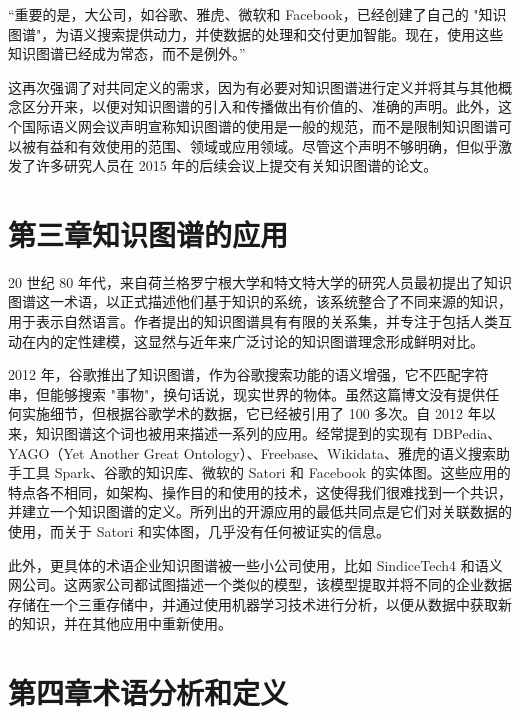 \documentclass[a4paper,AutoFakeBold,oneside,12pt]{book}
\begin{document}
\begin{nopagenumber}
	``重要的是，大公司，如谷歌、雅虎、微软和 Facebook，已经创建了自己的 "知识图谱"，为语义搜索提供动力，并使数据的处理和交付更加智能。现在，使用这些知识图谱已经成为常态，而不是例外。''

	这再次强调了对共同定义的需求，因为有必要对知识图谱进行定义并将其与其他概念区分开来，以便对知识图谱的引入和传播做出有价值的、准确的声明。此外，这个国际语义网会议声明宣称知识图谱的使用是一般的规范，而不是限制知识图谱可以被有益和有效使用的范围、领域或应用领域。尽管这个声明不够明确，但似乎激发了许多研究人员在 2015 年的后续会议上提交有关知识图谱的论文。

	\newpage
	\chapter*{第三章\quad{}知识图谱的应用}
	\newtranschapter

	20 世纪 80 年代，来自荷兰格罗宁根大学和特文特大学的研究人员最初提出了知识图谱这一术语，以正式描述他们基于知识的系统，该系统整合了不同来源的知识，用于表示自然语言。作者提出的知识图谱具有有限的关系集，并专注于包括人类互动在内的定性建模，这显然与近年来广泛讨论的知识图谱理念形成鲜明对比。

	2012 年，谷歌推出了知识图谱，作为谷歌搜索功能的语义增强，它不匹配字符串，但能够搜索 "事物"，换句话说，现实世界的物体。虽然这篇博文没有提供任何实施细节，但根据谷歌学术的数据，它已经被引用了 100 多次。自 2012 年以来，知识图谱这个词也被用来描述一系列的应用。经常提到的实现有 DBPedia、YAGO（Yet Another Great Ontology）、Freebase、Wikidata、雅虎的语义搜索助手工具 Spark、谷歌的知识库、微软的 Satori 和 Facebook 的实体图。这些应用的特点各不相同，如架构、操作目的和使用的技术，这使得我们很难找到一个共识，并建立一个知识图谱的定义。所列出的开源应用的最低共同点是它们对关联数据的使用，而关于 Satori 和实体图，几乎没有任何被证实的信息。

	此外，更具体的术语企业知识图谱被一些小公司使用，比如 SindiceTech4 和语义网公司。这两家公司都试图描述一个类似的模型，该模型提取并将不同的企业数据存储在一个三重存储中，并通过使用机器学习技术进行分析，以便从数据中获取新的知识，并在其他应用中重新使用。

	\newpage
	\chapter*{第四章\quad{}术语分析和定义}
	\newtranschapter


\end{nopagenumber}
\end{document}
